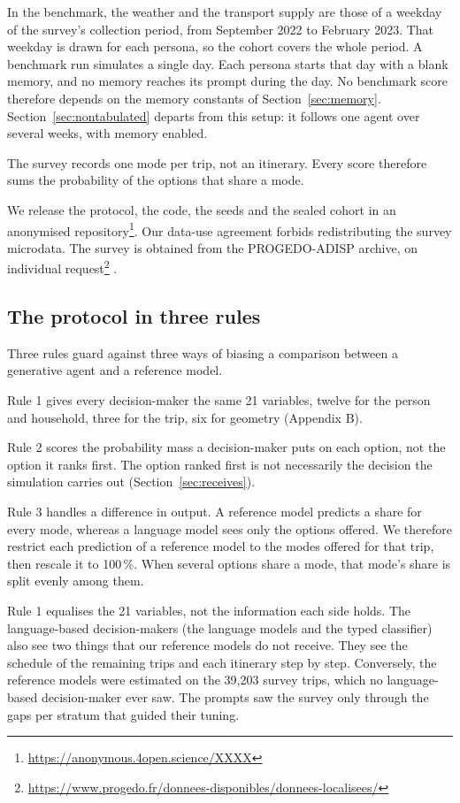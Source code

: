 In the benchmark, the weather and the transport supply are those of a weekday of the survey's
collection period, from September 2022 to February 2023. That weekday is drawn for each
persona, so the cohort covers the whole period. A benchmark run simulates a single day. Each
persona starts that day with a blank memory, and no memory reaches its prompt during the day.
No benchmark score therefore depends on the memory constants of Section~\ref{sec:memory}.
Section~\ref{sec:nontabulated} departs from this setup: it follows one agent over several
weeks, with memory enabled.

The survey records one mode per trip, not an itinerary. Every score therefore sums the
probability of the options that share a mode.

We release the protocol, the code, the seeds and the sealed cohort in an anonymised
repository\footnote{\url{https://anonymous.4open.science/XXXX}}. Our data-use agreement forbids
redistributing the survey microdata. The survey is obtained from the PROGEDO-ADISP archive,
on individual
request\footnote{\url{https://www.progedo.fr/donnees-disponibles/donnees-localisees/}}
\citep{tisseo2023emc2}.

\subsection{The protocol in three rules}
\label{sec:rules}

Three rules guard against three ways of biasing a comparison between a generative agent and a
reference model.

Rule 1 gives every decision-maker the same 21 variables, twelve for the person and
household, three for the trip, six for geometry (Appendix B).

Rule 2 scores the probability mass a decision-maker puts on each option, not the option it
ranks first. The option ranked first is not necessarily the decision the simulation carries out
(Section~\ref{sec:receives}).

Rule 3 handles a difference in output. A reference model predicts a share for every mode,
whereas a language model sees only the options offered. We therefore restrict each
prediction of a reference model to the modes offered for that trip, then rescale it to
100\,\%. When several options share a mode, that mode's share is split evenly among them.

Rule 1 equalises the 21 variables, not the information each side holds. The language-based
decision-makers (the language models and the typed classifier) also see two things that our
reference models do not receive. They see the schedule of the remaining trips and each
itinerary step by step. Conversely, the reference models were estimated on the 39{,}203
survey trips, which no language-based decision-maker ever saw. The prompts saw the survey
only through the gaps per stratum that guided their tuning.

